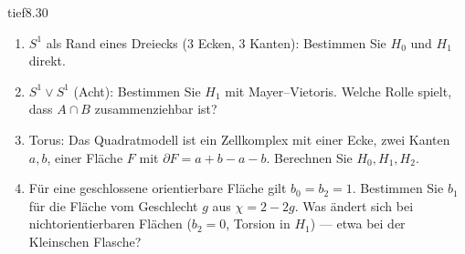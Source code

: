 \begin{karte}{tief}{8.30}{\typtypisch}{}
\begin{enumerate}[label=(\alph*),leftmargin=1.6em,itemsep=2pt]
\item $S^{1}$ als Rand eines Dreiecks ($3$ Ecken, $3$ Kanten): Bestimmen Sie $H_0$ und $H_1$ direkt.
\item $S^{1}\vee S^{1}$ (Acht): Bestimmen Sie $H_1$ mit Mayer--Vietoris. Welche Rolle spielt, dass $A\cap B$ zusammenziehbar ist?
\item Torus: Das Quadratmodell ist ein Zellkomplex mit einer Ecke, zwei Kanten $a, b$, einer Fläche $F$ mit $\partial F = a + b - a - b$. Berechnen Sie $H_0, H_1, H_2$.
\item Für eine geschlossene orientierbare Fläche gilt $b_0 = b_2 = 1$. Bestimmen Sie $b_1$ für die Fläche vom Geschlecht $g$ aus $\chi = 2 - 2g$. Was ändert sich bei nichtorientierbaren Flächen ($b_2 = 0$, Torsion in $H_1$) --- etwa bei der Kleinschen Flasche?
\end{enumerate}
\end{karte}

